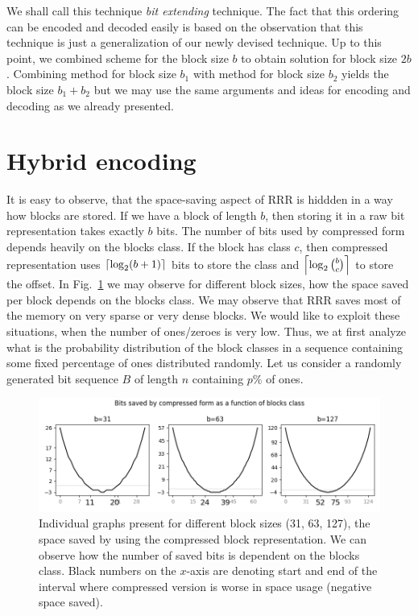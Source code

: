 We shall call this technique \textit{bit extending} technique. The fact that this
ordering can be encoded and decoded easily is based on the observation that this technique
is just a generalization of our newly devised technique. Up to this point, we combined
scheme for the block size $b$ to obtain solution for block size $2b$. Combining method
for block size $b_1$ with method for block size $b_2$ yields the block size $b_1+b_2$
but we may use the same arguments and ideas for encoding and decoding as we already presented. 

\section{Hybrid encoding}


It is easy to observe, that the space-saving aspect of RRR is hiddden in a way how blocks are stored.
If we have a block of length $b$, then storing it in a raw bit representation takes exactly $b$ bits.
The number of bits used by compressed form depends heavily on the blocks class. If the block
has class $c$, then compressed representation uses $\left\lceil \log_2 (b+1) \right\rceil$ bits to store the
class and $\left\lceil \log_2{b\choose c} \right\rceil$ to store the offset. In Fig.~\ref{obr:rrrSpaceSavings}
we may observe for different block sizes, how the space saved per block depends on the blocks
class. We may observe that RRR saves most of the memory on very sparse or very dense blocks.
We would like to exploit these situations, when the number of ones/zeroes is very low. Thus,
we at first analyze what is the probability distribution of the block classes in a sequence
containing some fixed percentage of ones distributed randomly. Let us consider a randomly generated
bit sequence $B$ of length $n$ containing $p\%$ of ones.

\begin{figure}
	\centerline{
		\includegraphics[width=\textwidth]{images/rrr_space_savings}
	}
	\caption[TODO]{Individual graphs present for different block sizes (31, 63, 127), 
    the space saved by using the compressed block representation. We can observe how
    the number of saved bits is dependent on the blocks class. Black numbers on the $x$-axis
    are denoting start and end of the interval where compressed version is worse
    in space usage (negative space saved).
	}
	\label{obr:rrrSpaceSavings}
\end{figure}

